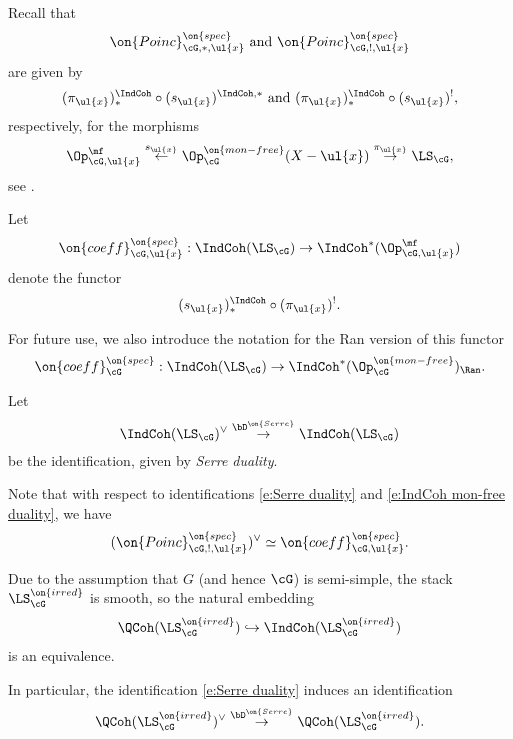 \documentclass[9pt]{amsart}
\theoremstyle{remark}
\theoremstyle{definition}
\theoremstyle{remark}
\numberwithin{equation}{section}
\begin{document}
\sssec{}

Recall that 
$$\on{Poinc}^{\on{spec}}_{\cG,*,\ul{x}} \text{ and } \on{Poinc}^{\on{spec}}_{\cG,!,\ul{x}}$$ are given by
$$(\pi_{\ul{x}})^{\IndCoh}_*\circ (s_{\ul{x}})^{\IndCoh,*} \text{ and } (\pi_{\ul{x}})^{\IndCoh}_*\circ (s_{\ul{x}})^!,$$
respectively, for the morphisms 
$$\Op^\mf_{\cG,\ul{x}} \overset{s_{\ul{x}}}\leftarrow 
\Op^{\on{mon-free}}_\cG(X-\ul{x})\overset{\pi_{\ul{x}}}\to \LS_\cG,$$
see \cite[Sects. 17.4.1 and 17.4.2]{GLC2}. 


\medskip

Let 
$$\on{coeff}^{\on{spec}}_{\cG,\ul{x}}:\IndCoh(\LS_\cG)\to  \IndCoh^*(\Op^\mf_{\cG,\ul{x}})$$
denote the functor
$$(s_{\ul{x}})^{\IndCoh}_*\circ (\pi_{\ul{x}})^!.$$

For future use, we also introduce the notation for the Ran version of this functor
$$\on{coeff}^{\on{spec}}_\cG:\IndCoh(\LS_\cG)\to  \IndCoh^*(\Op^{\on{mon-free}}_\cG)_\Ran.$$

\sssec{}

Let
\begin{equation} \label{e:Serre duality}
\IndCoh(\LS_\cG)^\vee \overset{\bD^{\on{Serre}}}\to \IndCoh(\LS_\cG)
\end{equation} 
be the identification, given by \emph{Serre duality}.

\medskip

Note that with respect to identifications \eqref{e:Serre duality} and \eqref{e:IndCoh mon-free duality}, 
we have
\begin{equation} \label{e:Poinc spec dual}
(\on{Poinc}^{\on{spec}}_{\cG,!,\ul{x}})^\vee  \simeq \on{coeff}^{\on{spec}}_{\cG,\ul{x}}.
\end{equation} 

\sssec{}

Due to the assumption that $G$ (and hence $\cG$) is semi-simple, the stack $\LS^{\on{irred}}_\cG$ is smooth, so the natural embedding
$$\QCoh(\LS^{\on{irred}}_\cG)\hookrightarrow \IndCoh(\LS^{\on{irred}}_\cG)$$
is an equivalence. 

\medskip

In particular, the identification \eqref{e:Serre duality} induces an identification 
\begin{equation} \label{e:Serre irred duality}
\QCoh(\LS^{\on{irred}}_\cG)^\vee \overset{\bD^{\on{Serre}}}\to \QCoh(\LS^{\on{irred}}_\cG).
\end{equation} 
\end{document}

